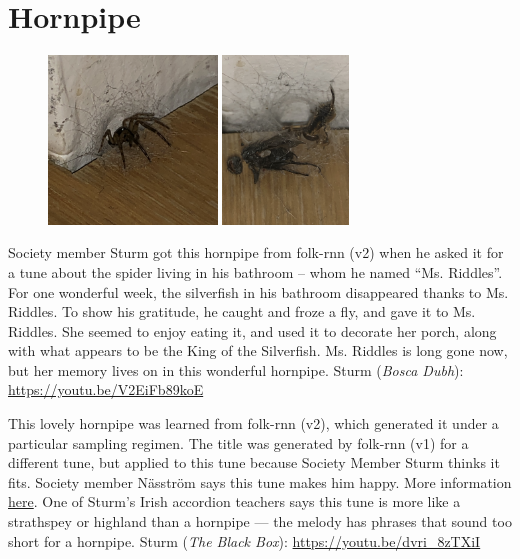 \documentclass[a4paper,notitlepage,twoside]{book}
\begin{document}
\section{Hornpipe}
{}  
 
\hypertarget{hornpipe:MsRiddles}{}
\begin{figure}
\includegraphics[width=0.4\textwidth]{MsRiddles.png}
\includegraphics[width=0.3\textwidth]{MsRiddles2.png}
\end{figure}
Society member Sturm got this hornpipe from folk-rnn (v2) 
when he asked it for a tune about the spider living in his bathroom – whom he named “Ms. Riddles”.
For one wonderful week, the silverfish in his bathroom disappeared thanks to Ms. Riddles. To show his gratitude, he caught and froze a fly, and gave it to Ms. Riddles. She seemed to enjoy eating it, and used it to decorate her porch, along with what appears to be the King of the Silverfish.
Ms. Riddles is long gone now, but her memory lives on in this wonderful hornpipe.
Sturm ({\em Bosca Dubh}): \url{https://youtu.be/V2EiFb89koE}

{}  
\hypertarget{hornpipe:LiddleShepe}{}
This lovely hornpipe was learned from folk-rnn (v2),
which generated it under a particular sampling regimen.
The title was generated by folk-rnn (v1) for a different tune, 
but applied to this tune because Society Member Sturm thinks it fits.
Society member Näsström says this tune makes him happy.
More information \href{https://highnoongmt.wordpress.com/2019/08/19/making-sense-of-the-folk-rnn-v2-model-part-11/}{here}.
One of Sturm's Irish accordion teachers says this tune is more like a strathspey or highland 
than a hornpipe --- the melody has phrases that sound too short for a hornpipe.
Sturm ({\em The Black Box}): \url{https://youtu.be/dvri_8zTXiI}
  
\end{document}
